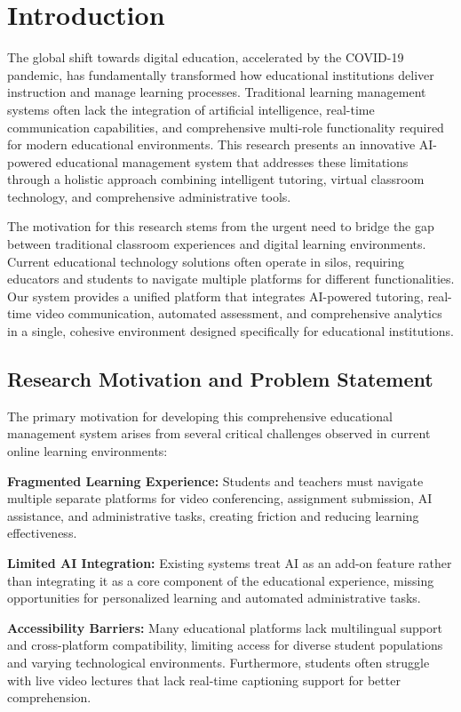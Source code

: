\documentclass[onecolumn]{IEEEtran}
\begin{document}
\section{Introduction}

The global shift towards digital education, accelerated by the COVID-19 pandemic, has fundamentally transformed how educational institutions deliver instruction and manage learning processes. Traditional learning management systems often lack the integration of artificial intelligence, real-time communication capabilities, and comprehensive multi-role functionality required for modern educational environments. This research presents an innovative AI-powered educational management system that addresses these limitations through a holistic approach combining intelligent tutoring, virtual classroom technology, and comprehensive administrative tools.

The motivation for this research stems from the urgent need to bridge the gap between traditional classroom experiences and digital learning environments. Current educational technology solutions often operate in silos, requiring educators and students to navigate multiple platforms for different functionalities. Our system provides a unified platform that integrates AI-powered tutoring, real-time video communication, automated assessment, and comprehensive analytics in a single, cohesive environment designed specifically for educational institutions.

\subsection{Research Motivation and Problem Statement}

The primary motivation for developing this comprehensive educational management system arises from several critical challenges observed in current online learning environments:

\textbf{Fragmented Learning Experience:} Students and teachers must navigate multiple separate platforms for video conferencing, assignment submission, AI assistance, and administrative tasks, creating friction and reducing learning effectiveness.

\textbf{Limited AI Integration:} Existing systems treat AI as an add-on feature rather than integrating it as a core component of the educational experience, missing opportunities for personalized learning and automated administrative tasks.

\textbf{Accessibility Barriers:} Many educational platforms lack multilingual support and cross-platform compatibility, limiting access for diverse student populations and varying technological environments. Furthermore, students often struggle with live video lectures that lack real-time captioning support for better comprehension.
\end{document}
